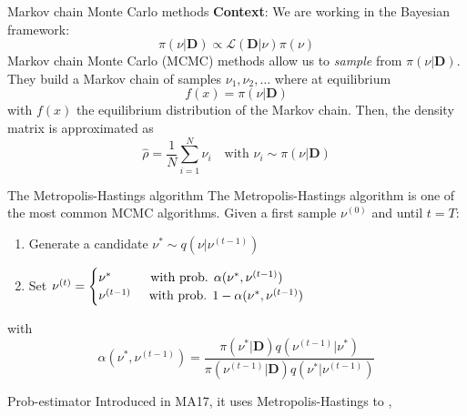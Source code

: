 \documentclass{beamer}
\newcommand{\mb}{\mathbf}
\newcommand{\tb}{\textbf}
\begin{document}
\begin{frame}{Markov chain Monte Carlo methods}
    \tb{Context}: We are working in the Bayesian framework:
    \begin{equation}
        \pi (\nu|\mb D) \propto \mathcal{L}(\mb D|\nu) \pi(\nu)
    \end{equation}
    Markov chain Monte Carlo (MCMC) methods allow us to \textit{sample} from $\pi (\nu|\mb D)$.\medbreak
    They build a Markov chain of samples $\nu_1, \nu_2, \dots$ where at equilibrium
    \begin{equation}
        f(x) =\pi (\nu|\mb D)
    \end{equation}
    with $f(x)$ the equilibrium distribution of the Markov chain.\medbreak
    Then, the density matrix is approximated as 
    \begin{equation}
        \hat \rho = \frac{1}{N}\sum_{i=1}^N \nu_i \quad \text{with } \nu_i \sim \pi(\nu|\mb D)
    \end{equation}
\end{frame}
\begin{frame}{The Metropolis-Hastings algorithm}
    The Metropolis-Hastings algorithm is one of the most common MCMC algorithms.\medbreak
    Given a first sample $\nu^{(0)}$ and until $t=T$:
    \begin{enumerate}
        \item Generate a candidate $\nu^* \sim q(\nu|\nu^{(t-1)})$
        \item Set $\nu^ {(t)} = \begin{cases}
            \nu^{*} \hspace{1.08cm} \text{with prob. } \alpha(\nu^*, \nu^{(t-1)})\\
            \nu^{(t-1)} \hspace{0.5cm} \text{with prob. } 1-\alpha(\nu^*, \nu^{(t-1)})
        \end{cases}$
    \end{enumerate}
    with \begin{equation}
        \alpha(\nu^*, \nu^{(t-1)}) = \frac{\pi(\nu^*|\mb D) q( \nu^{(t-1)}|\nu^*)}{\pi(\nu^{(t-1)}|\mb D) q( \nu^{*}|\nu^{(t-1)})}
    \end{equation}
\end{frame}
\begin{frame}{Prob-estimator}
    Introduced in MA17, it uses Metropolis-Hastings to , 
\end{frame}
\end{document}
